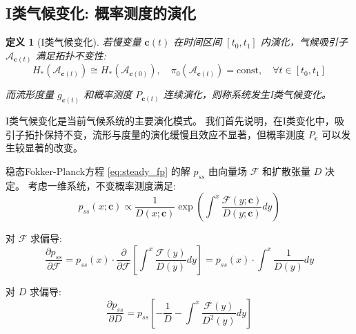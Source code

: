 \documentclass[12pt, a4paper]{article}
\newtheorem{definition}{定义}[section]
\newcommand{\metric}{g}
\newcommand{\measure}{P}
\newcommand{\attractor}{\mathcal{A}}
\newcommand{\slowvar}{\bm{c}}          %
\newcommand{\drift}{\mathcal{F}}  %
\newcommand{\difftensor}{D}       %
\newcommand{\probdens}{p}           %
\begin{document}
\subsection{I类气候变化: 概率测度的演化}

\begin{definition}[I类气候变化]
\label{def:type1_climate}
    若慢变量 $\slowvar(t)$ 在时间区间 $[t_0, t_1]$ 内演化，气候吸引子 $\attractor_{\slowvar(t)}$ 满足拓扑不变性:
    \begin{equation}
        H_*(\attractor_{\slowvar(t)}) \cong H_*(\attractor_{\slowvar(0)}), \quad \pi_0(\attractor_{\slowvar(t)}) = \text{const}, \quad \forall t \in [t_0, t_1]
    \end{equation}

    而流形度量 $\metric_{\slowvar(t)}$ 和概率测度 $\measure_{\slowvar(t)}$ 连续演化，则称系统发生I类气候变化。
\end{definition}

I类气候变化是当前气候系统的主要演化模式。
我们首先说明，在I类变化中，吸引子拓扑保持不变，流形与度量的演化缓慢且效应不显著，但概率测度 $\measure_{\slowvar}$ 可以发生较显著的改变。

稳态Fokker-Planck方程 \eqref{eq:steady_fp} 的解 $\probdens_{ss}$ 由向量场 $\drift$ 和扩散张量 $\difftensor$ 决定。
考虑一维系统，不变概率测度满足:
\begin{equation}
\label{eq:steady_fp_solution}
    \probdens_{ss}(x; \slowvar) \propto \frac{1}{\difftensor(x; \slowvar)} \exp\left(\int^x \frac{\drift(y; \slowvar)}{\difftensor(y; \slowvar)} dy\right)
\end{equation}

对 $\drift$ 求偏导:
\begin{equation}
\label{eq:sensitivity_mean_partial_f}
    \frac{\partial \probdens_{ss}}{\partial \drift} = \probdens_{ss}(x) \cdot \frac{\partial}{\partial \drift}\left[\int^x \frac{\drift(y)}{\difftensor(y)} dy\right] = \probdens_{ss}(x) \cdot \int^x \frac{1}{\difftensor(y)} dy
\end{equation}

对 $\difftensor$ 求偏导:
\begin{equation}
\label{eq:sensitivity_mean_partial_d}
    \frac{\partial \probdens_{ss}}{\partial \difftensor} = \probdens_{ss} \left[-\frac{1}{\difftensor} - \int^x \frac{\drift(y)}{\difftensor^2(y)} dy\right]
\end{equation}
\end{document}
